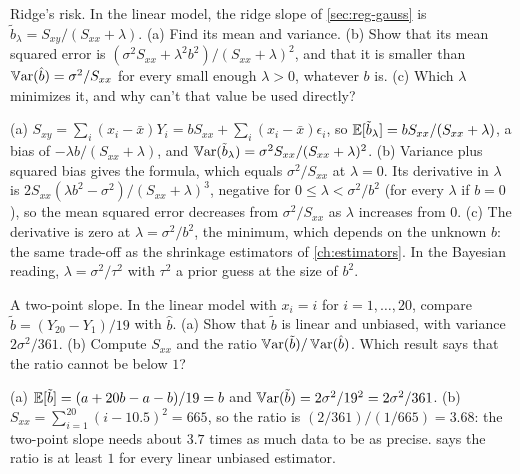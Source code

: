 \begin{exercise}
\label{ex:reg-ridge}
Ridge's risk. In the linear model, the ridge slope of \cref{sec:reg-gauss} is $\tilde{b}_\lambda = S_{xy}/(S_{xx} + \lambda)$. (a) Find its mean and variance. (b) Show that its mean squared error is $(\sigma^2S_{xx} + \lambda^2b^2)/(S_{xx} + \lambda)^2$, and that it is smaller than $\operatorname*{\mathbb{V}\text{ar}}(\hat{b}) = \sigma^2/S_{xx}$ for every small enough $\lambda > 0$, whatever $b$ is. (c) Which $\lambda$ minimizes it, and why can't that value be used directly?
\end{exercise}
\begin{solution}
(a) $S_{xy} = \sum_i (x_i - \bar{x})Y_i = bS_{xx} + \sum_i (x_i - \bar{x})\epsilon_i$, so $\operatorname*{\mathbb{E}}[\tilde{b}_\lambda] = bS_{xx}/(S_{xx} + \lambda)$, a bias of $-\lambda b/(S_{xx} + \lambda)$, and $\operatorname*{\mathbb{V}\text{ar}}(\tilde{b}_\lambda) = \sigma^2S_{xx}/(S_{xx} + \lambda)^2$. (b) Variance plus squared bias gives the formula, which equals $\sigma^2/S_{xx}$ at $\lambda = 0$. Its derivative in $\lambda$ is $2S_{xx}(\lambda b^2 - \sigma^2)/(S_{xx} + \lambda)^3$, negative for $0 \leq \lambda < \sigma^2/b^2$ (for every $\lambda$ if $b = 0$), so the mean squared error decreases from $\sigma^2/S_{xx}$ as $\lambda$ increases from $0$. (c) The derivative is zero at $\lambda = \sigma^2/b^2$, the minimum, which depends on the unknown $b$: the same trade-off as the shrinkage estimators of \cref{ch:estimators}. In the Bayesian reading, $\lambda = \sigma^2/\tau^2$ with $\tau^2$ a prior guess at the size of $b^2$.
\end{solution}

\begin{exercise}
\label{ex:reg-endpoints}
A two-point slope. In the linear model with $x_i = i$ for $i = 1, \ldots, 20$, compare $\tilde{b} = (Y_{20} - Y_1)/19$ with $\hat{b}$. (a) Show that $\tilde{b}$ is linear and unbiased, with variance $2\sigma^2/361$. (b) Compute $S_{xx}$ and the ratio $\operatorname*{\mathbb{V}\text{ar}}(\tilde{b})/\operatorname*{\mathbb{V}\text{ar}}(\hat{b})$. Which result says that the ratio cannot be below $1$?
\end{exercise}
\begin{solution}
(a) $\operatorname*{\mathbb{E}}[\tilde{b}] = (a + 20b - a - b)/19 = b$ and $\operatorname*{\mathbb{V}\text{ar}}(\tilde{b}) = 2\sigma^2/19^2 = 2\sigma^2/361$. (b) $S_{xx} = \sum_{i=1}^{20}(i - 10.5)^2 = 665$, so the ratio is $(2/361)/(1/665) = 3.68$: the two-point slope needs about $3.7$ times as much data to be as precise.  says the ratio is at least $1$ for every linear unbiased estimator.
\end{solution}
